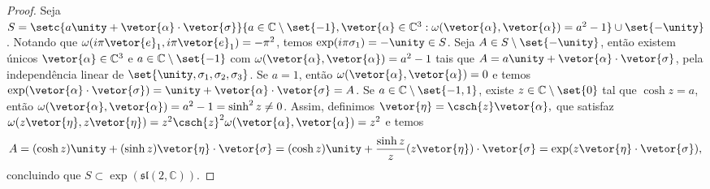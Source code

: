 \begin{proof}
    Seja \(S = \setc{a\unity + \vetor{\alpha}\cdot\vetor{\sigma}}{a \in \mathbb{C}\setminus\set{-1}, \vetor{\alpha} \in \mathbb{C}^3 : \omega(\vetor{\alpha}, \vetor{\alpha})= a^2 - 1}\cup\set{-\unity}\). Notando que \(\omega(i\pi\vetor{e}_1, i\pi \vetor{e}_1) = -\pi^2\), temos \(\exp(i\pi \sigma_1) = -\unity \in S\). Seja \(A \in S \setminus \set{-\unity}\), então existem únicos \(\vetor{\alpha} \in \mathbb{C}^3\) e \(a \in \mathbb{C}\setminus\set{-1}\) com \(\omega(\vetor{\alpha}, \vetor{\alpha}) = a^2 - 1\) tais que \(A = a \unity + \vetor{\alpha}\cdot{\vetor{\sigma}}\), pela independência linear de \(\set{\unity, \sigma_1, \sigma_2, \sigma_3}\).  Se \(a = 1\), então \(\omega(\vetor{\alpha},\vetor{\alpha}) = 0\) e temos \(\exp(\vetor{\alpha}\cdot\vetor{\sigma}) = \unity + \vetor{\alpha}\cdot\vetor{\sigma} = A\). Se \(a \in \mathbb{C} \setminus\set{-1, 1}\), existe \(z\in \mathbb{C}\setminus\set{0}\) tal que \(\cosh{z} = a\), então \(\omega(\vetor{\alpha}, \vetor{\alpha}) = a^2 - 1 = \sinh^2{z} \neq 0\). Assim, definimos \(\vetor{\eta} = \csch{z} \vetor{\alpha},\) que satisfaz \(\omega(z\vetor{\eta},z\vetor{\eta}) = z^2\csch{z}^2 \omega(\vetor{\alpha}, \vetor{\alpha}) = z^2\) e temos
    \begin{equation*}
        A = (\cosh{z})\unity + (\sinh{z}) \vetor{\eta}\cdot \vetor{\sigma} = (\cosh{z})\unity + \frac{\sinh{z}}{z}(z\vetor{\eta})\cdot \vetor{\sigma} = \exp(z \vetor{\eta}\cdot \vetor{\sigma}),
    \end{equation*}
    concluindo que \(S \subset \exp(\mathfrak{sl}(2,\mathbb{C}))\).


\end{proof}
